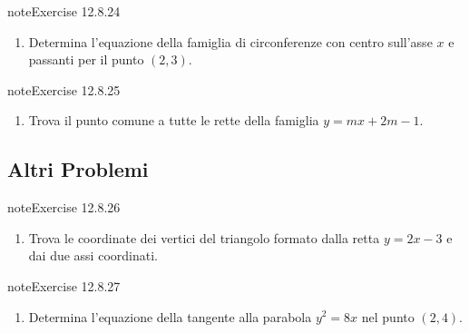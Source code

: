 \documentclass[letterpaper,10pt,italian]{jupyterBook}
\begin{document}
\begin{sphinxadmonition}{note}{Exercise 12.8.24}


\begin{enumerate}
%
\setcounter{enumi}{23}
\item {} 
\sphinxAtStartPar
Determina l’equazione della famiglia di circonferenze con centro sull’asse \( x \) e passanti per il punto \( (2, 3) \).

\end{enumerate}
\end{sphinxadmonition}
 \label{exercise:ch/analytic_geometry/analytic_geometry_2d/sol-exercise-24}

\begin{sphinxadmonition}{note}{Exercise 12.8.25}


\begin{enumerate}
%
\setcounter{enumi}{24}
\item {} 
\sphinxAtStartPar
Trova il punto comune a tutte le rette della famiglia \( y = mx + 2m - 1 \).

\end{enumerate}
\end{sphinxadmonition}


\subsection{Altri Problemi}
\label{\detokenize{ch/analytic_geometry/analytic_geometry_2d/sol:altri-problemi}} \label{exercise:ch/analytic_geometry/analytic_geometry_2d/sol-exercise-25}

\begin{sphinxadmonition}{note}{Exercise 12.8.26}


\begin{enumerate}
%
\setcounter{enumi}{25}
\item {} 
\sphinxAtStartPar
Trova le coordinate dei vertici del triangolo formato dalla retta \( y = 2x - 3 \) e dai due assi coordinati.

\end{enumerate}
\end{sphinxadmonition}
 \label{exercise:ch/analytic_geometry/analytic_geometry_2d/sol-exercise-26}

\begin{sphinxadmonition}{note}{Exercise 12.8.27}


\begin{enumerate}
%
\setcounter{enumi}{26}
\item {} 
\sphinxAtStartPar
Determina l’equazione della tangente alla parabola \( y^2 = 8x \) nel punto \( (2, 4) \).

\end{enumerate}
\end{sphinxadmonition}
 \label{exercise:ch/analytic_geometry/analytic_geometry_2d/sol-exercise-27}
\end{document}
